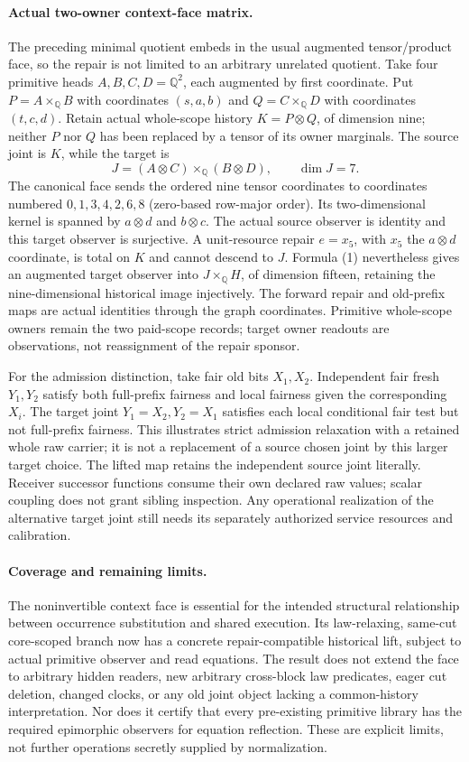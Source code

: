 \documentclass{article}
\begin{document}
\paragraph{Actual two-owner context-face matrix.}
The preceding minimal quotient embeds in the usual augmented tensor/product face, so the repair is not limited to an arbitrary unrelated quotient. Take four primitive heads $A,B,C,D=\mathbb Q^2$, each augmented by first coordinate. Put $P=A\times_{\mathbb Q}B$ with coordinates $(s,a,b)$ and $Q=C\times_{\mathbb Q}D$ with coordinates $(t,c,d)$. Retain actual whole-scope history $K=P\otimes Q$, of dimension nine; neither $P$ nor $Q$ has been replaced by a tensor of its owner marginals. The source joint is $K$, while the target is
\[
 J=(A\otimes C)\times_{\mathbb Q}(B\otimes D),\qquad \dim J=7.
\]
The canonical face sends the ordered nine tensor coordinates to coordinates numbered $0,1,3,4,2,6,8$ (zero-based row-major order). Its two-dimensional kernel is spanned by $a\otimes d$ and $b\otimes c$. The actual source observer is identity and this target observer is surjective. A unit-resource repair $e=x_5$, with $x_5$ the $a\otimes d$ coordinate, is total on $K$ and cannot descend to $J$. Formula (1) nevertheless gives an augmented target observer into $J\times_{\mathbb Q}H$, of dimension fifteen, retaining the nine-dimensional historical image injectively. The forward repair and old-prefix maps are actual identities through the graph coordinates. Primitive whole-scope owners remain the two paid-scope records; target owner readouts are observations, not reassignment of the repair sponsor.

For the admission distinction, take fair old bits $X_1,X_2$. Independent fair fresh $Y_1,Y_2$ satisfy both full-prefix fairness and local fairness given the corresponding $X_i$. The target joint $Y_1=X_2,Y_2=X_1$ satisfies each local conditional fair test but not full-prefix fairness. This illustrates strict admission relaxation with a retained whole raw carrier; it is not a replacement of a source chosen joint by this larger target choice. The lifted map retains the independent source joint literally. Receiver successor functions consume their own declared raw values; scalar coupling does not grant sibling inspection. Any operational realization of the alternative target joint still needs its separately authorized service resources and calibration.

\paragraph{Coverage and remaining limits.}
The noninvertible context face is essential for the intended structural relationship between occurrence substitution and shared execution. Its law-relaxing, same-cut core-scoped branch now has a concrete repair-compatible historical lift, subject to actual primitive observer and read equations. The result does not extend the face to arbitrary hidden readers, new arbitrary cross-block law predicates, eager cut deletion, changed clocks, or any old joint object lacking a common-history interpretation. Nor does it certify that every pre-existing primitive library has the required epimorphic observers for equation reflection. These are explicit limits, not further operations secretly supplied by normalization.
\end{document}
